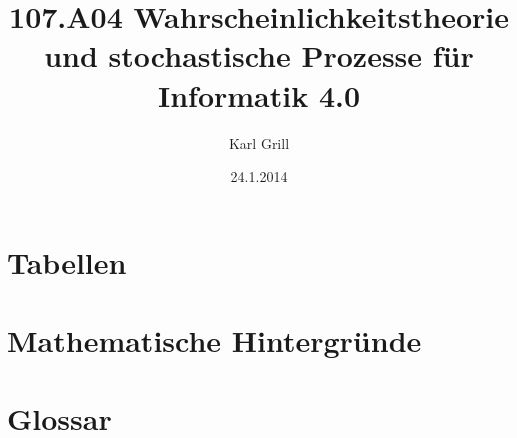 \documentclass{scrbook}
\title{107.A04 Wahrscheinlichkeitstheorie und stochastische Prozesse 
für Informatik 4.0}
\author{Karl Grill}
\date{24.1.2014}
\begin{document}
\maketitle
\tableofcontents





%
\begin{appendix}
\chapter{Tabellen}

\chapter{Mathematische Hintergründe}


\chapter{Glossar}
\printglossary[type=symbolslist,style=long]

{}


\printindex
\end{appendix}
\end{document}
